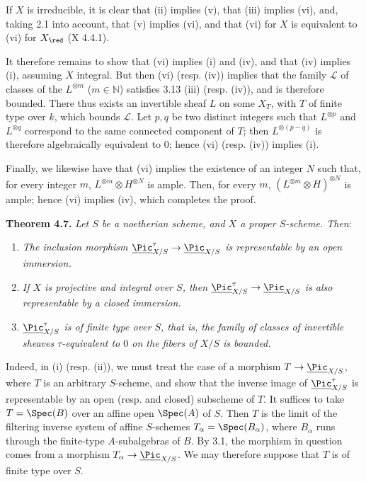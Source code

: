 If \(X\) is irreducible, it is clear that (ii) implies (v), that (iii) implies (vi), and, taking 2.1 into account, that (v) implies (vi), and that (vi) for \(X\) is equivalent to (vi) for \(X_{\red}\) (X 4.4.1).

It therefore remains to show that (vi) implies (i) and (iv), and that (iv) implies (i), assuming \(X\) integral. But then (vi) (resp. (iv)) implies that the family \(\mathcal L\) of classes of the \(L^{\otimes m}\) (\(m\in\mathbb N\)) satisfies 3.13 (iii) (resp. (iv)), and is therefore bounded. There thus exists an invertible sheaf \(L\) on some \(X_T\), with \(T\) of finite type over \(k\), which bounds \(\mathcal L\). Let \(p,q\) be two distinct integers such that \(L^{\otimes p}\) and \(L^{\otimes q}\) correspond to the same connected component of \(T\); then \(L^{\otimes(p-q)}\) is therefore algebraically equivalent to \(0\); hence (vi) (resp. (iv)) implies (i).

Finally, we likewise have that (vi) implies the existence of an integer \(N\) such that, for every integer \(m\), \(L^{\otimes m}\otimes H^{\otimes N}\) is ample. Then, for every \(m\), \((L^{\otimes m}\otimes H)^{\otimes N}\) is ample; hence (vi) implies (iv), which completes the proof.

\textbf{Theorem 4.7.} \emph{Let \(S\) be a noetherian scheme, and \(X\) a proper \(S\)-scheme. Then}:
\begin{enumerate}[label=(\roman*)]
\item \emph{The inclusion morphism \(\underline{\Pic}^\tau_{X/S}\to\underline{\Pic}_{X/S}\) is representable by an open immersion.}
\item
\emph{If \(X\) is projective and integral over \(S\), then \(\underline{\Pic}^\tau_{X/S}\to\underline{\Pic}_{X/S}\)
%
is also representable by a closed immersion.}
\item \emph{\(\underline{\Pic}^\tau_{X/S}\) is of finite type over \(S\), that is, the family of classes of invertible sheaves \(\tau\)-equivalent to \(0\) on the fibers of \(X/S\) is bounded.}
\end{enumerate}

Indeed, in (i) (resp. (ii)), we must treat the case of a morphism \(T\to\underline{\Pic}_{X/S}\), where \(T\) is an arbitrary \(S\)-scheme, and show that the inverse image of \(\underline{\Pic}^\tau_{X/S}\) is representable by an open (resp. and closed) subscheme of \(T\). It suffices to take \(T=\Spec(B)\) over an affine open \(\Spec(A)\) of \(S\). Then \(T\) is the limit of the filtering inverse system of affine \(S\)-schemes \(T_\alpha=\Spec(B_\alpha)\), where \(B_\alpha\) runs through the finite-type \(A\)-subalgebras of \(B\). By 3.1, the morphism in question comes from a morphism \(T_\alpha\to\underline{\Pic}_{X/S}\). We may therefore suppose that \(T\) is of finite type over \(S\).

